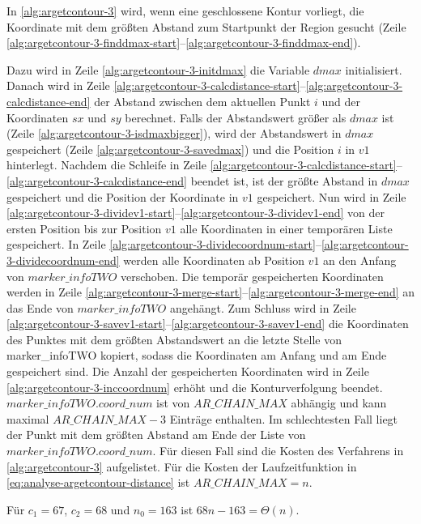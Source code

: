 In \autoref{alg:argetcontour-3} wird, wenn eine geschlossene Kontur vorliegt, die Koordinate mit dem größten Abstand
 zum Startpunkt der Region gesucht (Zeile
 \ref{alg:argetcontour-3-finddmax-start}--\ref{alg:argetcontour-3-finddmax-end}).

Dazu wird in Zeile \ref{alg:argetcontour-3-initdmax} die Variable $\mathit{dmax}$ initialisiert. Danach wird in Zeile
 \ref{alg:argetcontour-3-calcdistance-start}--\ref{alg:argetcontour-3-calcdistance-end} der Abstand zwischen dem
 aktuellen Punkt $i$ und der Koordinaten $\mathit{sx}$ und $\mathit{sy}$ berechnet. Falls der Abstandswert größer als
 $\mathit{dmax}$ ist (Zeile \ref{alg:argetcontour-3-isdmaxbigger}), wird der Abstandswert in $\mathit{dmax}$
 gespeichert (Zeile \ref{alg:argetcontour-3-savedmax}) und die Position $i$ in $\mathit{v1}$ hinterlegt. Nachdem die
 Schleife in Zeile \ref{alg:argetcontour-3-calcdistance-start}--\ref{alg:argetcontour-3-calcdistance-end} beendet ist,
 ist der größte Abstand in $\mathit{dmax}$ gespeichert und die Position der Koordinate in $\mathit{v1}$ gespeichert.
 Nun wird in Zeile \ref{alg:argetcontour-3-dividev1-start}--\ref{alg:argetcontour-3-dividev1-end} von der ersten
 Position bis zur Position $\mathit{v1}$ alle Koordinaten in einer temporären Liste gespeichert. In Zeile
 \ref{alg:argetcontour-3-dividecoordnum-start}--\ref{alg:argetcontour-3-dividecoordnum-end} werden alle Koordinaten ab
 Position $\mathit{v1}$ an den Anfang von $\mathit{marker\_infoTWO}$ verschoben. Die temporär gespeicherten Koordinaten
 werden in Zeile \ref{alg:argetcontour-3-merge-start}--\ref{alg:argetcontour-3-merge-end} an das Ende von
 $\mathit{marker\_infoTWO}$ angehängt. Zum Schluss wird in Zeile
 \ref{alg:argetcontour-3-savev1-start}--\ref{alg:argetcontour-3-savev1-end} die Koordinaten des Punktes mit dem größten
 Abstandswert an die letzte Stelle von marker\_infoTWO kopiert, sodass die Koordinaten am Anfang und am Ende
 gespeichert sind. Die Anzahl der gespeicherten Koordinaten wird in Zeile \ref{alg:argetcontour-3-inccoordnum} erhöht
 und die Konturverfolgung beendet. $\mathit{marker\_infoTWO.coord\_num}$ ist von $\mathit{AR\_CHAIN\_MAX}$ abhängig und
 kann maximal $\mathit{AR\_CHAIN\_MAX} - 3$ Einträge enthalten. Im schlechtesten Fall liegt der Punkt mit dem größten
 Abstand am Ende der Liste von $\mathit{marker\_infoTWO.coord\_num}$. Für diesen Fall sind die Kosten des Verfahrens
 in \autoref{alg:argetcontour-3} aufgelistet. Für die Kosten der Laufzeitfunktion in
 \autoref{eq:analyse-argetcontour-distance} ist $\mathit{AR\_CHAIN\_MAX} = n$.

Für $c_{1} = 67$, $c_{2} = 68$ und $n_{0} = 163$ ist $68n - 163 = \Theta(n)$.

